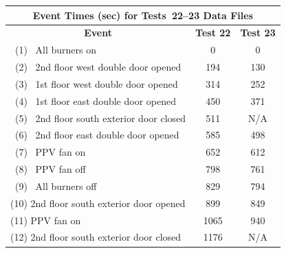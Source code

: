 \begin{figure}[!ht]
\renewcommand{\baselinestretch}{1}
\begin{minipage}[b]{0.88\columnwidth}
\begin{center}
	\begin{tabular}{lcc}
	\multicolumn{3}{c}{Event Times (sec) for Tests~22--23 Data Files} \\
	\toprule
	\multicolumn{1}{c}{\textbf{Event}} 			& \textbf{Test 22}	& \textbf{Test 23} \\
	\midrule
	~(1)~  All burners on 						&   0	  			&	 0			\\
	~(2)~  2nd floor west double door opened 	&   194		  		&    130		\\
	~(3)~  1st floor west double door opened 	&	314		  		&    252 	 	\\
	~(4)~  1st floor east double door opened 	&   450			  	&    371		\\
	~(5)~  2nd floor south exterior door closed &   511		  		&    N/A		\\
	~(6)~  2nd floor east double door opened	&   585			  	&    498		\\
	~(7)~  PPV fan on 							&   652			  	&    612		\\
	~(8)~  PPV fan off              			&   798			  	&    761		\\
	~(9)~  All burners off 						&   829			  	&    794		\\
	(10)   2nd floor south exterior door opened &   899			  	&    849		\\
	(11)   PPV fan on 	 						&   1065		  	&    940		\\
	(12)   2nd floor south exterior door closed &   1176		  	&    N/A		\\
	\bottomrule
	\end{tabular}

\end{center}
\end{minipage}
\end{figure}
